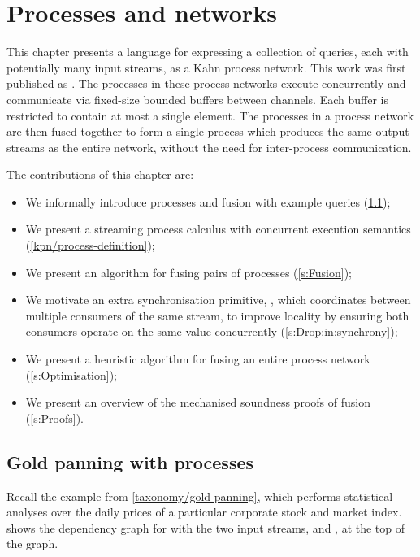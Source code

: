 \chapter{Processes and networks}
\label{chapter:process:processes}

This chapter presents a language for expressing a collection of queries, each with potentially many input streams, as a Kahn process network.
This work was first published as \citet{robinson2017machine}.
The processes in these process networks execute concurrently and communicate via fixed-size bounded buffers between channels.
Each buffer is restricted to contain at most a single element.
The processes in a process network are then fused together to form a single process which produces the same output streams as the entire network, without the need for inter-process communication.

The contributions of this chapter are:
\begin{itemize}
\item
We informally introduce processes and fusion with example queries (\cref{kpn/gold-panning});
\item
We present a streaming process calculus with concurrent execution semantics (\cref{kpn/process-definition});
\item
We present an algorithm for fusing pairs of processes (\cref{s:Fusion});
\item
We motivate an extra synchronisation primitive, \lstiproc@drop@, which coordinates between multiple consumers of the same stream, to improve locality by ensuring both consumers operate on the same value concurrently
(\cref{s:Drop:in:synchrony});
\item
We present a heuristic algorithm for fusing an entire process network (\cref{s:Optimisation});
\item
We present an overview of the mechanised soundness proofs of fusion (\cref{s:Proofs}).
\end{itemize}



\section{Gold panning with processes}
\label{kpn/gold-panning}
Recall the \lstiproc@priceAnalyses@ example from \cref{taxonomy/gold-panning}, which performs statistical analyses over the daily prices of a particular corporate stock and market index.
 shows the dependency graph for \lstiproc@priceAnalyses@ with the two input streams, \lstiproc@index@ and \lstiproc@stock@, at the top of the graph.

